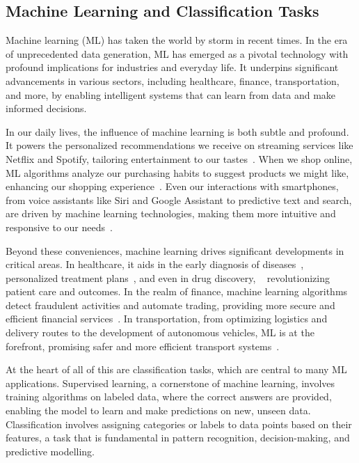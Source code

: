 \documentclass[letterpaper,10pt]{article}
\begin{document}
\subsection{Machine Learning and Classification Tasks} \label{beyondscopestart}
Machine learning (ML) has taken the world by storm in recent times. In the era of unprecedented data generation, ML has emerged as a pivotal technology with profound implications for industries and everyday life. It underpins significant advancements in various sectors, including healthcare, finance, transportation, and more, by enabling intelligent systems that can learn from data and make informed decisions. \par
In our daily lives, the influence of machine learning is both subtle and profound. It powers the personalized recommendations we receive on streaming services like Netflix and Spotify, tailoring entertainment to our tastes~\cite{NetflixRecommendations,SpotifyPlaylistGen}. When we shop online, ML algorithms analyze our purchasing habits to suggest products we might like, enhancing our shopping experience~\cite{MediaRecommendationSystemsSurvey}. Even our interactions with smartphones, from voice assistants like Siri and Google Assistant to predictive text and search, are driven by machine learning technologies, making them more intuitive and responsive to our needs~\cite{GoogleAssistantLookAndTalk, SiriML}.
\par
Beyond these conveniences, machine learning drives significant developments in critical areas. In healthcare, it aids in the early diagnosis of diseases~\cite{diabetesclassification}, personalized treatment plans~\cite{PersonalisedMedicineDeepLearning}, and even in drug discovery, ~\cite{DrugDiscoveryDeepLearning} revolutionizing patient care and outcomes. In the realm of finance, machine learning algorithms detect fraudulent activities and automate trading, providing more secure and efficient financial services~\cite{FinanceFraudDeepLearning}. In transportation, from optimizing logistics and delivery routes to the development of autonomous vehicles, ML is at the forefront, promising safer and more efficient transport systems~\cite{TransportationLogisticsML}. \par
At the heart of all of this are classification tasks, which are central to many ML applications. Supervised learning, a cornerstone of machine learning, involves training algorithms on labeled data, where the correct answers are provided, enabling the model to learn and make predictions on new, unseen data. Classification involves assigning categories or labels to data points based on their features, a task that is fundamental in pattern recognition, decision-making, and predictive modelling.
\end{document}
